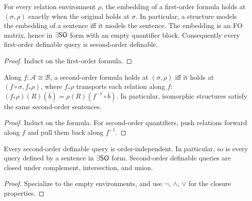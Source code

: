 \begin{theorem}
  \label{thm:desc-fo-in-so}
  \leanok
  For every relation environment $\rho$, the embedding of a first-order formula
  holds at $(\sigma, \rho)$ exactly when the original holds at $\sigma$. In
  particular, a structure models the embedding of a sentence iff it models the
  sentence. The embedding is an FO matrix, hence in $\exists\mathsf{SO}$ form with an
  empty quantifier block. Consequently every first-order definable query is
  second-order definable.
\end{theorem}
\begin{proof}
  \leanok
  Induct on the first-order formula.
\end{proof}

\begin{theorem}
  \label{thm:desc-so-iso-invariance}
  \leanok
  Along $f : \mathcal{A} \cong \mathcal{B}$, a second-order formula holds at
  $(\sigma, \rho)$ iff it holds at $(f \circ \sigma, f_*\rho)$, where
  $f_*\rho$ transports each relation along $f$:
  $(f_*\rho)(R)(\bar b) = \rho(R)(f^{-1} \circ \bar b)$. In particular,
  isomorphic structures satisfy the same second-order sentences.
\end{theorem}
\begin{proof}
  \leanok
  Induct on the formula. For second-order quantifiers, push relations forward
  along $f$ and pull them back along $f^{-1}$.
\end{proof}

\begin{theorem}
  \label{thm:desc-so-definable}
  \leanok
  Every second-order definable query is order-independent. In particular, so is
  every query defined by a sentence in $\exists\mathsf{SO}$ form. Second-order
  definable queries are closed under complement, intersection, and union.
\end{theorem}
\begin{proof}
  \leanok
  Specialize to the empty environments, and use $\neg$, $\wedge$, $\vee$ for the
  closure properties.
\end{proof}

